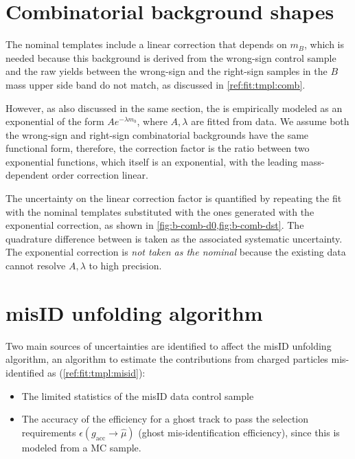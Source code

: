 \section{Combinatorial background shapes}
\label{sys-model-comb}

The nominal \BComb templates include a linear correction that depends on $m_B$,
which is needed because this background is derived from the wrong-sign control
sample and the raw yields between the wrong-sign and the right-sign samples
in the $B$ mass upper side band do not match,
as discussed in \cref{ref:fit:tmpl:comb}.

However, as also discussed in the same section,
the \BComb is empirically modeled as an exponential of the form
$A e^{-\lambda m_b}$,
where $A, \lambda$ are fitted from data.
We assume both the wrong-sign and right-sign combinatorial backgrounds have the
same functional form,
therefore, the correction factor is the ratio between two exponential functions,
which itself is an exponential,
with the leading mass-dependent order correction linear.

The uncertainty on the linear correction factor is quantified by
repeating the fit with the nominal \BComb templates substituted with
the ones generated with the exponential correction,
as shown in
\cref{fig:b-comb-d0,fig:b-comb-dst}.
The quadrature difference between \RDX is taken as the associated systematic
uncertainty.
The exponential correction is \emph{not taken as the nominal} because the
existing data cannot resolve $A, \lambda$ to high precision.


\section{\muon misID unfolding algorithm}
\label{sys-algo-misid}

Two main sources of uncertainties are identified to affect the \muon misID
unfolding algorithm, an algorithm to estimate the contributions from charged
particles mis-identified as \muon (\cref{ref:fit:tmpl:misid}):
\begin{itemize}
    \item The limited statistics of the misID data control sample
    \item The accuracy of the efficiency for a ghost track to pass the \muon
        selection requirements $\epsilon(g_\text{acc} \rightarrow \hat{\mu})$
        (ghost mis-identification efficiency),
        since this is modeled from a MC sample.
\end{itemize}

